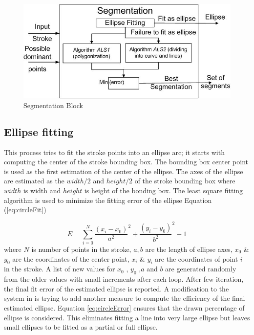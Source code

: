 \documentclass[preprint,1p,times,review]{elsarticle}
\begin{document}
 \begin{figure}
	\centering
		\includegraphics[scale=0.48]{blockSmall.jpg}
	\caption{Segmentation Block}
	\label{fig:segblock}
\end{figure}
\subsection{Ellipse fitting}  This process tries to fit the stroke points into an ellipse arc; it starts with computing the center of the stroke bounding box. The bounding box center point is used as the first estimation of the center of the ellipse. The axes of the ellipse are estimated as the $width/2$ and $height/2$ of the stroke bounding box where $width$ is width and $height$ is height of the bonding box. The least square fitting algorithm \cite{chernov} is used to minimize the fitting error of the ellipse Equation (\ref{eq:circleFit})

\begin{equation}
E = \sum\limits_{i = 0}^N {\frac{{(x_i - x_0 )}}{{a^2 }}^2  + \frac{{(y_i - y_0
)}}{{b^2 }}^2  - 1}
\label{eq:circleFit}
\end{equation}
  where $N$ is number of points in the stroke, $a,b$ are the length of ellipse axes, $x_0$ \& $y_0$ are the coordinates of the center point, $x_i$ \& $y_i$ are the coordinates of point $i$ in the stroke. A list of new values for $x_0$ , $y_0$ ,$a$ and $b$ are generated randomly from the older values with small increments after each loop.  After few iteration, the final fit error of the estimated ellipse is reported. A modification to the system in \cite{mypaper} is trying to add another measure to compute the efficiency of the final estimated ellipse. Equation \ref{eq:circleError} ensures that the drawn percentage of ellipse is considered. This eliminates fitting a line into very large ellipse but leaves small ellipses to be fitted as a partial or full ellipse.
\end{document}
